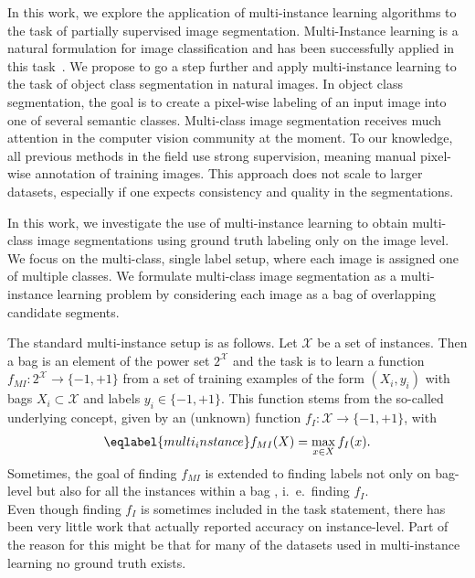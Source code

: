 In this work, we explore the 
application of multi-instance learning algorithms to the task of partially supervised image segmentation.
Multi-Instance learning is a natural formulation for image classification and has been
successfully applied in this task~\cite{zhou2007multi}. We propose to go a step further and apply
multi-instance learning to the task of object class segmentation in natural
images.  In object class segmentation, the goal is to create a pixel-wise
labeling of an input image into one of several semantic
classes.  Multi-class image segmentation receives much attention in the
computer vision community at the moment. To our knowledge, all previous
methods in the field use strong supervision, meaning manual pixel-wise annotation of
training images. This approach does not
scale to larger datasets, especially if one expects consistency and quality
in the segmentations.

In this work, we investigate the use of multi-instance
learning to obtain multi-class image segmentations using ground truth labeling
only on the image level.
We focus on the multi-class, single label setup, where each image is assigned
one of multiple classes. We formulate multi-class image segmentation as
a multi-instance learning problem by considering each image as a bag of
overlapping candidate segments. 

The standard multi-instance setup is as follows. Let $\mathcal{X}$ be a set of
instances. Then a bag is an element of the power set $2^\mathcal{X}$ and the
task is to learn a function
$f_{MI} \colon 2^\mathcal{X} \rightarrow \{-1,+1\}$
from a set of training examples of the form $(X_i,y_i)$ with
bags $X_i \subset \mathcal{X}$ and labels $y_i \in \{-1,+1\}$.  This function
stems from the so-called underlying concept, given by an (unknown) function
$f_{I} \colon \mathcal{X} \rightarrow \{-1,+1\}$, with 
\vspace{-3mm}
\begin{equation}\eqlabel{multi_instance}
f_{MI}(X)= \max_{x \in X} f_{I}(x).
\vspace{-3mm}
\end{equation} 
Sometimes, the goal of finding $f_{MI}$ is extended to finding labels not only
on bag-level but also for all the instances within a bag
\cite{liconvex2010,zha2008joint}, i.\ e.\ finding $f_{I}$.\\ 
Even though finding $f_{I}$ is sometimes included in the task statement, there
has been very little work that actually reported accuracy on instance-level. Part
of the reason for this might be that for many of the datasets used in
multi-instance learning no ground truth exists.

